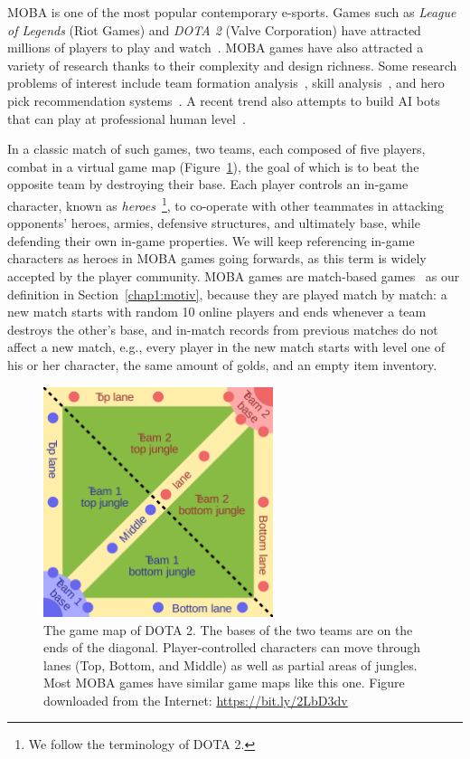 MOBA is one of the most popular contemporary e-sports. Games such as \textit{League of Legends} (Riot Games) and \textit{DOTA 2} (Valve Corporation) have attracted millions of players to play and watch~\cite{lol_fanbase,lol_27million}. MOBA games have also attracted a variety of research thanks to their complexity and design richness. Some research problems of interest include team formation analysis~\cite{pobie1,pobie2,neidhardt2015team,kim2016proficiency}, skill analysis~\cite{zhengxing2016player,Drachen:skill}, and hero pick recommendation systems~\cite{summerville2017reco,hanke2017reco}. A recent trend also attempts to build AI bots that can play at professional human level~\cite{openaidota}. 

In a classic match of such games, two teams, each composed of five players, combat in a virtual game map (Figure~\ref{fig:moba_map}), the goal of which is to beat the opposite team by destroying their base. Each player controls an in-game character, known as \textit{heroes}~\footnote{We follow the terminology of DOTA 2.}, to co-operate with other teammates in attacking opponents' heroes, armies, defensive structures, and ultimately base, while defending their own in-game properties. We will keep referencing in-game characters as heroes in MOBA games going forwards, as this term is widely accepted by the player community. MOBA games are match-based games~\cite{guo2012analysis} as our definition in Section~\ref{chap1:motiv}, because they are played match by match: a new match starts with random 10 online players and ends whenever a team destroys the other's base, and in-match records from previous matches do not affect a new match, e.g., every player in the new match starts with level one of his or her character, the same amount of golds, and an empty item inventory.


\begin{figure}
\centering
\includegraphics[width=0.6\textwidth]{Figures/map_of_dota.png}
\caption{The game map of DOTA 2. The bases of the two teams are on the ends of the diagonal. Player-controlled characters can move through lanes (Top, Bottom, and Middle) as well as partial areas of jungles. Most MOBA games have similar game maps like this one. Figure downloaded from the Internet: \url{https://bit.ly/2LbD3dv}}
\label{fig:moba_map}
\end{figure}

